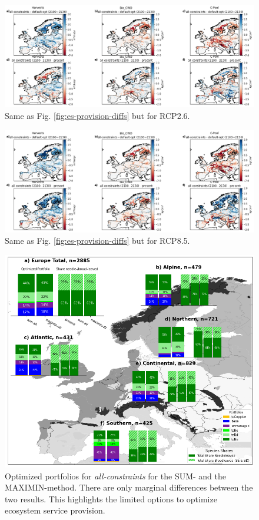\documentclass[]{article}
\begin{document}
\begin{figure}[h!]
	\centering		\includegraphics[width=\linewidth]{supplement_figs/es_provision_diffs26.png}
	\caption{Same as Fig. \ref{fig:es-provision-diffs} but for RCP2.6.}
	\label{fig:es-provision-diffs26}
\end{figure}



\begin{figure}[h!]
	\centering		\includegraphics[width=\linewidth]{supplement_figs/es_provision_diffs85.png}
	\caption{Same as Fig. \ref{fig:es-provision-diffs} but for RCP8.5.}
	\label{fig:es-provision-diffs85}
\end{figure}


\begin{figure}[h!]
	\centering
	\includegraphics[width=0.9\linewidth]{supplement_figs/sum_vs_minmax_all.png}
	\caption{Optimized portfolios for \textit{all-constraints} for the SUM- and the MAXIMIN-method. There are only marginal differences between the two results. This highlights the limited options to optimize ecosystem service provision.}
	\label{fig:sum-vs-minmax}
\end{figure}
\end{document}

